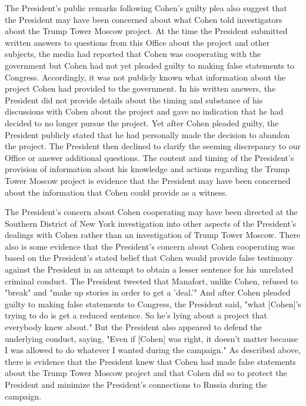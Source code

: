 {The President's public remarks following Cohen's guilty plea also suggest that the President may have been concerned about what Cohen told investigators about the Trump Tower Moscow project.
At the time the President submitted written answers to questions from this Office about the project and other subjects, the media had reported that Cohen was cooperating with the government but Cohen had not yet pleaded guilty to making false statements to Congress.
Accordingly, it was not publicly known what information about the project Cohen had provided to the government.
In his written answers, the President did not provide details about the timing and substance of his discussions with Cohen about the project and gave no indication that he had decided to no longer pursue the project.
Yet after Cohen pleaded guilty, the President publicly stated that he had personally made the decision to abandon the project.
The President then declined to clarify the seeming discrepancy to our Office or answer additional questions.
The content and timing of the President's provision of information about his knowledge and actions regarding the Trump Tower Moscow project is evidence that the President may have been concerned about the information that Cohen could provide as a witness.

The President's concern about Cohen cooperating may have been directed at the Southern District of New York investigation into other aspects of the President's dealings with Cohen rather than an investigation of Trump Tower Moscow.
There also is some evidence that the President's concern about Cohen cooperating was based on the President's stated belief that Cohen would provide false testimony against the President in an attempt to obtain a lesser sentence for his unrelated criminal conduct.
The President tweeted that Manafort, unlike Cohen, refused to "break" and "make up stories in order to get a 'deal.'"
And after Cohen pleaded guilty to making false statements to Congress, the President said, "what [Cohen]'s trying to do is get a reduced sentence.
So he's lying about a project that everybody knew about." But the President also appeared to defend the underlying conduct, saying, "Even if [Cohen] was right, it doesn't matter because I was allowed to do whatever I wanted during the campaign."
As described above, there is evidence that the President knew that Cohen had made false statements about the Trump Tower Moscow project and that Cohen did so to protect the President and minimize the President's connections to Russia during the campaign.

}
